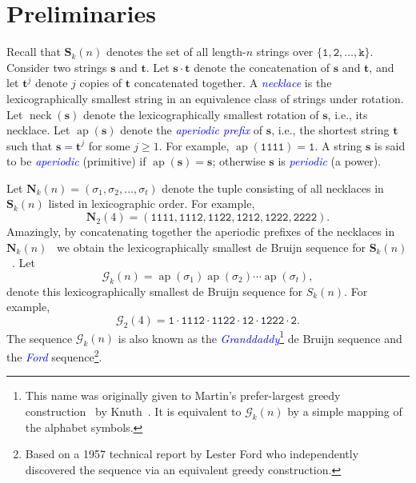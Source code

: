 \documentclass[US-letter,USenglish,authorcolumns,autoref]{lipics-v2021}
\renewcommand{\tt} {\mathtt}
\newcommand{\bS}{\mathbf{S}}
\newcommand{\bN}{\mathbf{N}}
\newcommand{\bs}{\mathbf{s}}
\newcommand{\bt}{\mathbf{t}}
\newcommand{\defo}[1] {\emph{\textcolor{blue}{#1}}}
\DeclareMathOperator{\ap}{ap}
\DeclareMathOperator{\neck}{neck}
\begin{document}



\section{Preliminaries} \label{sec:back}

Recall that $\bS_k(n)$ denotes the set of all length-$n$ strings over $\{\tt{1,2, \ldots, k}\}$.  Consider two strings $\bs$ and $\bt$.  
Let  $\bs \cdot \bt$ denote the  concatenation of $\bs$ and $\bt$, and   let $\bt^j$ denote $j$ copies of $\bt$ concatenated together.
%
%
A \defo{necklace} is the lexicographically smallest string in an equivalence class of strings under rotation.  
%
Let $\neck(\bs)$ denote the lexicographically smallest rotation of $\bs$, i.e., its necklace. Let $\ap(\bs)$ denote the \defo{aperiodic prefix} of $\bs$, i.e., the shortest string $\bt$ such that $\bs = \bt^j$ for some $j \geq 1$.
For example, $\ap(\tt{1111}) = \tt{1}$.  A string $\bs$ is said to be \defo{aperiodic} (primitive) if $\ap(\bs) = \bs$; otherwise $\bs$ is \defo{periodic} (a power). %


Let $\bN_k(n) = (\sigma_1, \sigma_2, \ldots, \sigma_t)$ denote the tuple consisting of all necklaces in $\bS_k(n)$ listed in lexicographic order. For example, 
%
\[ \bN_2(4) = ( \tt{1111, 1112, 1122, 1212, 1222, 2222} ). \]
%
Amazingly, by concatenating together the aperiodic prefixes of the necklaces in $\bN_k(n)$~\cite{fredricksen-beads-colors} we obtain the lexicographically smallest de Bruijn sequence for $\bS_k(n)$~\cite{fredricksen-beads-colors,fred-lex-least}.
Let
\[\mathcal{G}_k(n) = \ap(\sigma_1) \ap(\sigma_2)  \cdots \ap(\sigma_t), \]
denote this lexicographically smallest de Bruijn sequence for $S_k(n)$.
For example,
%
\[ \mathcal{G}_2(4)  = \tt{1 \cdot 1112 \cdot  1122 \cdot 12 \cdot 1222 \cdot 2}.\]
%
The sequence $\mathcal{G}_k(n)$ is also known as the \defo{Granddaddy}\footnote{
This name was originally given to Martin's prefer-largest greedy construction~\cite{martin} by Knuth~\cite[p.317]{knuth}.  
It is equivalent to $\mathcal{G}_k(n)$ by a simple mapping of the alphabet symbols.} de Bruijn sequence and the \defo{Ford} sequence\footnote{Based on a 1957 technical report by Lester Ford who independently discovered the sequence via an equivalent greedy construction.}. 
\end{document}
